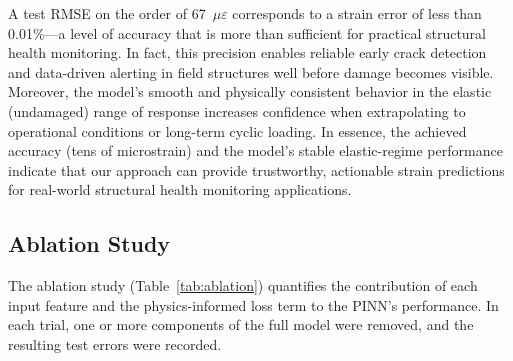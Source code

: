 \documentclass{article}
\begin{document}
A test RMSE on the order of 67~$\mu\varepsilon$ corresponds to a strain error of less than 0.01\%—a level of accuracy that is more than sufficient for practical structural health monitoring. In fact, this precision enables reliable early crack detection and data-driven alerting in field structures well before damage becomes visible. Moreover, the model’s smooth and physically consistent behavior in the elastic (undamaged) range of response increases confidence when extrapolating to operational conditions or long-term cyclic loading. In essence, the achieved accuracy (tens of microstrain) and the model’s stable elastic-regime performance indicate that our approach can provide trustworthy, actionable strain predictions for real-world structural health monitoring applications.

\subsection{Ablation Study}

The ablation study (Table~\ref{tab:ablation}) quantifies the contribution of each input feature and the physics-informed loss term to the PINN’s performance. In each trial, one or more components of the full model were removed, and the resulting test errors were recorded.
\end{document}
